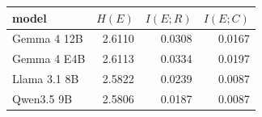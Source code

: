 \begin{tabular}{lrrr}
\toprule
model & $H(E)$ & $I(E;R)$ & $I(E;C)$ \\
\midrule
Gemma 4 12B & 2.6110 & 0.0308 & 0.0167 \\
Gemma 4 E4B & 2.6113 & 0.0334 & 0.0197 \\
Llama 3.1 8B & 2.5822 & 0.0239 & 0.0087 \\
Qwen3.5 9B & 2.5806 & 0.0187 & 0.0087 \\
\bottomrule
\end{tabular}
